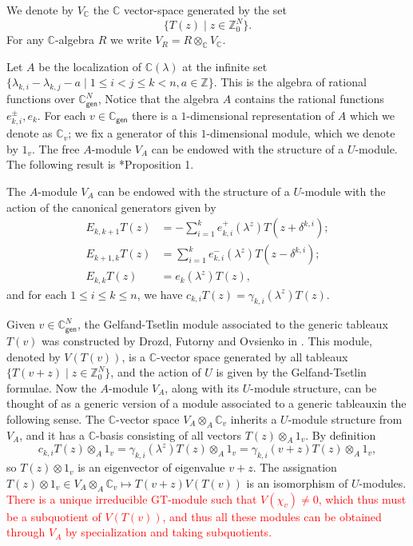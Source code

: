 \documentclass[11pt,fleqn]{article}
\newcommand\CC{\mathbb C}
\newcommand\ZZ{\mathbb Z}
\newcommand\ot{\otimes}
\newcommand\gen{\mathsf{gen}}
\begin{document}
\begin{Definition}
We denote by $V_\CC$ the $\CC$ vector-space generated by the set 
\[
  \{T(z) \mid z \in \ZZ^N_0\}.
\]
For any $\CC$-algebra $R$ we write $V_R = R \ot_\CC V_\CC$.
\end{Definition} 

Let $A$ be the localization of $\CC(\lambda)$ at the infinite set 
$\{\lambda_{k,i} - \lambda_{k,j} - a \mid 1 \leq i < j \leq k < n, a \in 
\ZZ\}$. This is the algebra of rational functions over $\CC^N_\gen$, Notice 
that the algebra $A$ contains the rational functions $e_{k,i}^\pm, e_k$. 
For each $v \in \CC_\gen$ there is a $1$-dimensional representation of $A$ 
which we denote as $\CC_v$; we fix a generator of this $1$-dimensional module, 
which we denote by $1_v$. The free $A$-module $V_A$ can be endowed with the 
structure of a $U$-module. The following result is 
\cite{Zad-1-sing}*{Proposition 1}.

\begin{Proposition}
\label{P:universal-generic-GT-module}
The $A$-module $V_A$ can be endowed with the structure of a $U$-module 
with the action of the canonical generators given by
\begin{align*}
E_{k,k+1} T(z) 
  &= - \sum_{i=1}^k e_{k,i}^+(\lambda^z) T(z + \delta^{k,i}); \\
E_{k+1,k} T(z) 
  &= \sum_{i=1}^k e_{k,i}^-(\lambda^z) T(z - \delta^{k,i}); \\
E_{k,k} T(z)
  &= e_k(\lambda^z) T(z),
\end{align*}
and for each $1 \leq i \leq k \leq n$, we have $c_{k,i} T(z) = 
\gamma_{k,i}(\lambda^z) T(z)$. 
\end{Proposition}

Given $v \in \CC^N_\gen$, the Gelfand-Tsetlin module associated to the generic 
tableaux $T(v)$ was constructed by Drozd, Futorny and Ovsienko in 
\cite{DFO-GT-modules}. This module, denoted by $V(T(v))$, is a $\CC$-vector 
space generated by all tableaux $\{T(v+z) \mid z \in \ZZ^N_0\}$, and the 
action of $U$ is given by the Gelfand-Tsetlin formulae. Now the $A$-module 
$V_A$, along with its $U$-module structure, can be thought of as a generic 
version of a module associated to a generic tableauxin the following sense. 
The $\CC$-vector space $V_A \ot_A \CC_v$ inherits a $U$-module structure from 
$V_A$, and it has a $\CC$-basis consisting of all vectors $T(z) \ot_A 1_v$. 
By definition 
\[
  c_{k,i} T(z) \ot_A 1_v 
    = \gamma_{k,i}(\lambda^z) T(z) \ot_A 1_v 
    = \gamma_{k,i}(v + z) T(z) \ot_A 1_v,
\]
so $T(z) \ot 1_v$ is an eigenvector of eigenvalue $v + z$. The assignation 
$T(z) \ot 1_v \in V_A \ot_A \CC_v \mapsto T(v+z) V(T(v))$ is an isomorphism of 
$U$-modules. \textcolor{red}{There is a unique irreducible GT-module such that 
$V(\chi_v) \neq 0$, which thus must be a subquotient of $V(T(v))$, and thus 
all these modules can be obtained through $V_A$ by specialization and taking 
subquotients.}
\end{document}

